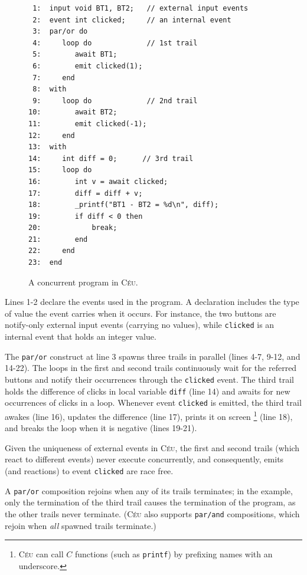 \documentclass[preprint]{sigplanconf}
\newcommand{\CEU}{\textsc{C\'{e}u}\xspace}
\newcommand{\code}[1] {{\small{\texttt{#1}}}}
\newcommand{\1}{\;}
\newcommand{\2}{\;\;}
\newcommand{\3}{\;\;\;}
\newcommand{\5}{\;\;\;\;\;}
\begin{document}
\begin{figure}[t]
{\small
\begin{verbatim}
 1:  input void BT1, BT2;   // external input events
 2:  event int clicked;     // an internal event
 3:  par/or do
 4:     loop do             // 1st trail
 5:        await BT1;
 6:        emit clicked(1);
 7:     end
 8:  with
 9:     loop do             // 2nd trail
10:        await BT2;
11:        emit clicked(-1);
12:     end
13:  with
14:     int diff = 0;      // 3rd trail
15:     loop do
16:        int v = await clicked;
17:        diff = diff + v;
18:        _printf("BT1 - BT2 = %d\n", diff);
19:        if diff < 0 then
20:            break;
21:        end
22:     end
23:  end
\end{verbatim}
}%
\caption{ A concurrent program in \CEU.
\label{lst:ceu:1}
}
\end{figure}

Lines 1-2 declare the events used in the program.
A declaration includes the type of value the event carries when it occurs.
For instance, the two buttons are notify-only external input events (carrying 
no values), while \code{clicked} is an internal event that holds an integer 
value.

The \code{par/or} construct at line 3 spawns three trails in parallel (lines 
4-7, 9-12, and 14-22).
The loops in the first and second trails continuously wait for the referred 
buttons and notify their occurrences through the \code{clicked} event.
The third trail holds the difference of clicks in local variable \code{diff} 
(line 14) and awaits for new occurrences of clicks in a loop.
Whenever event \code{clicked} is emitted, the third trail awakes (line 16), 
updates the difference (line 17), prints it on screen%
\footnote{
\CEU can call $C$ functions (such as \code{printf}) by prefixing names with an 
underscore.
} (line 18), and breaks the loop when it is negative (lines 19-21).

Given the uniqueness of external events in \CEU, the first and second trails 
(which react to different events) never execute concurrently, and consequently, 
emits (and reactions) to event \code{clicked} are race free.

A \code{par/or} composition rejoins when any of its trails terminates;
in the example, only the termination of the third trail causes the termination 
of the program, as the other trails never terminate.
(\CEU also supports \code{par/and} compositions, which rejoin when \emph{all} 
spawned trails terminate.)
\end{document}
